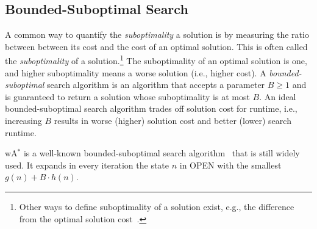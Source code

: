\documentclass{article}
\newcommand\roni[1]{\nb{\textbf{Roni:}}{orange}{#1}}
\newcommand{\open}{\textsc{OPEN}\xspace}
\newcommand{\ps}{\ac{PS}\xspace}
\newcommand{\wastar}{wA$^*$\xspace}
\newcommand{\astarepsilon}{A$^*_\epsilon$\xspace}
\begin{document}






\subsection{Bounded-Suboptimal Search}
A common way to quantify the \emph{suboptimality} a solution is by measuring the ratio between between its cost and the cost of an optimal solution. This is often called the \emph{suboptimality} of a solution.\footnote{Other ways to define suboptimality of a solution exist, e.g., the difference from the optimal solution cost~\cite{valenzano2013using}.} 
The suboptimality of an optimal solution is one, and higher suboptimality means a worse solution (i.e., higher cost). A \emph{bounded-suboptimal} search algorithm is an algorithm that accepts a parameter $B\geq 1$ and is guaranteed to return a solution whose suboptimality is at most $B$. %
An ideal bounded-suboptimal search algorithm trades off solution cost for runtime, i.e., increasing $B$ results in worse (higher) solution cost and better (lower) search runtime. %



\wastar is a well-known bounded-suboptimal search algorithm~\cite{Pohl70HeuristicSearchPathFinding} that is still widely used. 
It expands in every iteration the state $n$ in \open with the smallest $g(n)+B\cdot h(n)$. 
\end{document}
